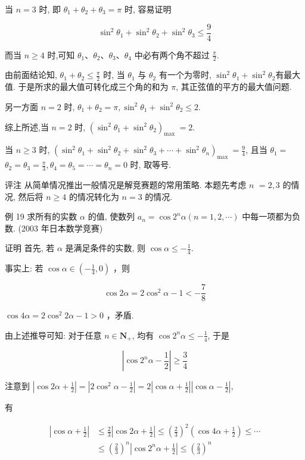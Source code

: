 	当 $n=3$ 时, 即 $\theta_{1}+\theta_{2}+\theta_{3}=\pi$ 时, 容易证明

	$$
		\sin ^{2} \theta_{1}+\sin ^{2} \theta_{2}+\sin ^{2} \theta_{3} \leqslant \frac{9}{4}
	$$

	而当 $n \geqslant 4$ 时,可知 $\theta_{1} 、 \theta_{2} 、 \theta_{3} 、 \theta_{4}$ 中必有两个角不超过 $\frac{\pi}{2}$.

	由前面结论知, $\theta_{1}+\theta_{2} \leqslant \frac{\pi}{2}$ 时, 当 $\theta_{1}$ 与 $\theta_{2}$ 有一个为零时, $\sin ^{2} \theta_{1}+\sin ^{2} \theta_{2}$有最大值. 于是所求的最大值可转化成三个角的和为 $\pi$, 其正弦值的平方的最大值问题.

	另一方面 $n=2$ 时, $\theta_{1}+\theta_{2}=\pi, \sin ^{2} \theta_{1}+\sin ^{2} \theta_{2} \leqslant 2$.

	综上所述,当 $n=2$ 时, $\left(\sin ^{2} \theta_{1}+\sin ^{2} \theta_{2}\right)_{\text {max }}=2$.

	当 $n \geqslant 3$ 时, $\left(\sin ^{2} \theta_{1}+\sin ^{2} \theta_{2}+\sin ^{2} \theta_{3}+\cdots+\sin ^{2} \theta_{n}\right)_{\text {max }}=\frac{9}{4}$, 且当 $\theta_{1}=$ $\theta_{2}=\theta_{3}=\frac{\pi}{3}, \theta_{4}=\theta_{5}=\cdots=\theta_{n}=0$ 时, 取等号.

	评注 从简单情况推出一般情况是解竞赛题的常用策略. 本题先考虑 $n$ $=2,3$ 的情况, 然后将 $n \geqslant 4$ 的情况转化为 $n=3$ 的情况.

	例 19 求所有的实数 $\alpha$ 的值, 使数列 $a_{n}=\cos 2^{n} \alpha(n=1,2, \cdots)$ 中每一项都为负数. (2003 年日本数学竞赛)

	证明 首先, 若 $\alpha$ 是满足条件的实数, 则 $\cos \alpha \leqslant-\frac{1}{4}$.

	事实上: 若 $\cos \alpha \in\left(-\frac{1}{4}, 0\right)$ ，则

	$$
		\cos 2 \alpha=2 \cos ^{2} \alpha-1<-\frac{7}{8}
	$$

$\cos 4 \alpha=2 \cos ^{2} 2 \alpha-1>0$ ，矛盾.

	由上述推导可知: 对于任意 $n \in \mathbf{N}_{+}$, 均有 $\cos 2^{n} \alpha \leqslant-\frac{1}{4}$, 于是

	$$
		\left|\cos 2^{n} \alpha-\frac{1}{2}\right| \geqslant \frac{3}{4}
	$$

	注意到 $\left|\cos 2 \alpha+\frac{1}{2}\right|=\left|2 \cos ^{2} \alpha-\frac{1}{2}\right|=2\left|\cos \alpha+\frac{1}{2}\right|\left|\cos \alpha-\frac{1}{2}\right|$,

	有

	$$
		\begin{aligned}
			\left|\cos \alpha+\frac{1}{2}\right| & \leqslant \frac{2}{3}\left|\cos 2 \alpha+\frac{1}{2}\right| \leqslant\left(\frac{2}{3}\right)^{2}\left(\cos 4 \alpha+\frac{1}{2}\right) \leqslant \cdots \\
			                                     & \leqslant\left(\frac{2}{3}\right)^{n}\left|\cos 2^{n} \alpha+\frac{1}{2}\right| \leqslant\left(\frac{2}{3}\right)^{n}
		\end{aligned}
	$$

